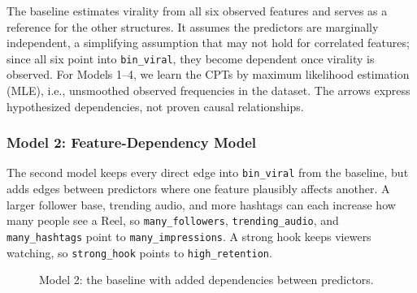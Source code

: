 \documentclass{article}
\begin{document}
The baseline estimates virality from all six observed features and serves as
a reference for the other structures. It assumes the predictors are
marginally independent, a simplifying assumption that may not hold for
correlated features; since all six point into \texttt{bin\_viral}, they
become dependent once virality is observed. For Models 1--4, we learn the
CPTs by maximum likelihood estimation (MLE), i.e., unsmoothed observed
frequencies in the dataset. The arrows express hypothesized dependencies, not
proven causal relationships.

\subsubsection{Model 2: Feature-Dependency Model}
The second model keeps every direct edge into \texttt{bin\_viral} from the
baseline, but adds edges between predictors where one feature plausibly
affects another. A larger follower base, trending audio, and more hashtags
can each increase how many people see a Reel, so \texttt{many\_followers},
\texttt{trending\_audio}, and \texttt{many\_hashtags} point to
\texttt{many\_impressions}. A strong hook keeps viewers watching, so
\texttt{strong\_hook} points to \texttt{high\_retention}.

\begin{figure}[H]
  \centering
  \caption{Model 2: the baseline with added dependencies between predictors.}
  \label{fig:model-dependency}
\end{figure}
\end{document}
